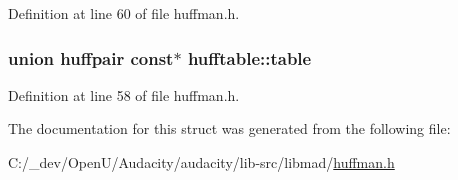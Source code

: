 Definition at line 60 of file huffman.\+h.

\subsubsection[{\texorpdfstring{table}{table}}]{\setlength{\rightskip}{0pt plus 5cm}union {\bf huffpair} {\bf const}$\ast$ hufftable\+::table}\hypertarget{structhufftable_a375b5d7f480ee73dd16d1933e9ca0128}{}\label{structhufftable_a375b5d7f480ee73dd16d1933e9ca0128}


Definition at line 58 of file huffman.\+h.



The documentation for this struct was generated from the following file\+:\begin{DoxyCompactItemize}
\item 
C\+:/\+\_\+dev/\+Open\+U/\+Audacity/audacity/lib-\/src/libmad/\hyperlink{huffman_8h}{huffman.\+h}\end{DoxyCompactItemize}

